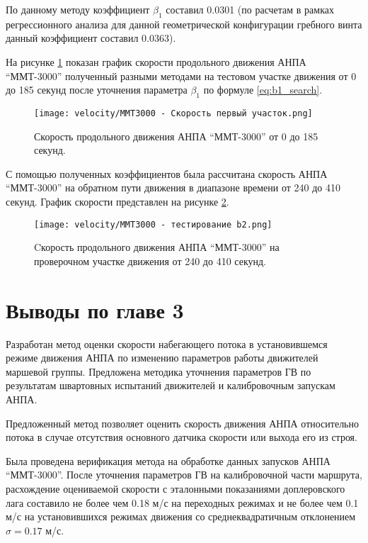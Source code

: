 По данному методу коэффициент $\beta_1$ составил 0.0301 (по расчетам в рамках регрессионного анализа для данной геометрической конфигурации гребного винта данный коэффициент составил 0.0363).

На рисунке \ref{fig:mmt3000_velocity_test} показан график скорости продольного движения АНПА ``ММТ-3000'' полученный разными методами на тестовом участке движения от 0 до 185 секунд после уточнения параметра $\beta_1$ по формуле \ref{eq:b1_search}.

\begin{figure}[ht]
    \centering
    \texttt{[image: velocity/MMT3000 - Скорость первый участок.png]}
    \caption{Скорость продольного движения АНПА ``ММТ-3000'' от 0 до 185 секунд.}
    \label{fig:mmt3000_velocity_test}
\end{figure}

С помощью полученных коэффициентов была рассчитана скорость АНПА ``ММТ-3000'' на обратном пути движения в диапазоне времени от 240 до 410 секунд.
График скорости представлен на рисунке \ref{fig:mmt3000_velocity_check}.

\begin{figure}[ht]
    \centering
    \texttt{[image: velocity/ММТ3000 - тестирование b2.png]}
    \caption{Cкорость продольного движения АНПА ``ММТ-3000'' на проверочном участке движения от 240 до 410 секунд.}
    \label{fig:mmt3000_velocity_check}
\end{figure}

\section{Выводы по главе 3}
Разработан метод оценки скорости набегающего потока в установившемся режиме движения АНПА по изменению параметров работы движителей маршевой группы.
Предложена методика уточнения параметров ГВ по результатам швартовных испытаний движителей и калибровочным запускам АНПА.

Предложенный метод позволяет оценить скорость движения АНПА относительно потока в случае отсутствия основного датчика скорости или выхода его из строя.

Была проведена верификация метода на обработке данных запусков АНПА ``ММТ-3000''.
После уточнения параметров ГВ на калибровочной части маршрута, расхождение оцениваемой скорости с эталонными показаниями доплеровского лага составило не более чем 0.18 м/с на переходных режимах и не более чем 0.1 м/с на установившихся режимах движения со среднеквадратичным отклонением $\sigma=0.17$ м/с.
